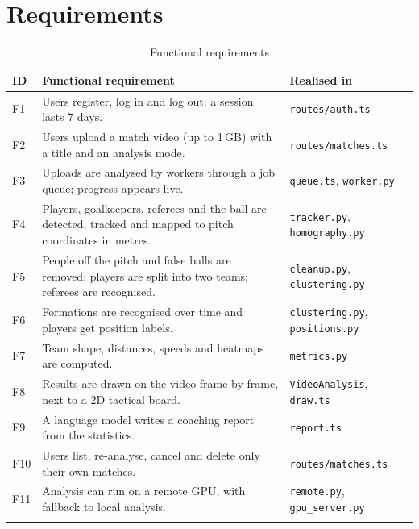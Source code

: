 \section{Requirements}

\begin{longtable}{|p{}|p{}|p{}|}
	\hline
	\textbf{ID} & \textbf{Functional requirement} & \textbf{Realised in} \\
	\hline
	\endhead
	F1 & Users register, log in and log out; a session lasts 7 days. & \texttt{routes/\allowbreak{}auth.\allowbreak{}ts} \\
	\hline
	F2 & Users upload a match video (up to 1\,GB) with a title and an analysis mode. & \texttt{routes/\allowbreak{}matches.\allowbreak{}ts} \\
	\hline
	F3 & Uploads are analysed by workers through a job queue; progress appears live. & \texttt{queue.ts}, \texttt{worker.py} \\
	\hline
	F4 & Players, goalkeepers, referees and the ball are detected, tracked and mapped to pitch coordinates in metres. & \texttt{tracker.py}, \texttt{homography.py} \\
	\hline
	F5 & People off the pitch and false balls are removed; players are split into two teams; referees are recognised. & \texttt{cleanup.py}, \texttt{clustering.py} \\
	\hline
	F6 & Formations are recognised over time and players get position labels. & \texttt{clustering.py}, \texttt{positions.py} \\
	\hline
	F7 & Team shape, distances, speeds and heatmaps are computed. & \texttt{metrics.py} \\
	\hline
	F8 & Results are drawn on the video frame by frame, next to a 2D tactical board. & \texttt{VideoAnalysis}, \texttt{draw.ts} \\
	\hline
	F9 & A language model writes a coaching report from the statistics. & \texttt{report.ts} \\
	\hline
	F10 & Users list, re-analyse, cancel and delete only their own matches. & \texttt{routes/\allowbreak{}matches.\allowbreak{}ts} \\
	\hline
	F11 & Analysis can run on a remote GPU, with fallback to local analysis. & \texttt{remote.py}, \texttt{gpu\_\allowbreak{}server.\allowbreak{}py} \\
	\hline
	\caption{Functional requirements}
	\label{tab:functional}
\end{longtable}

